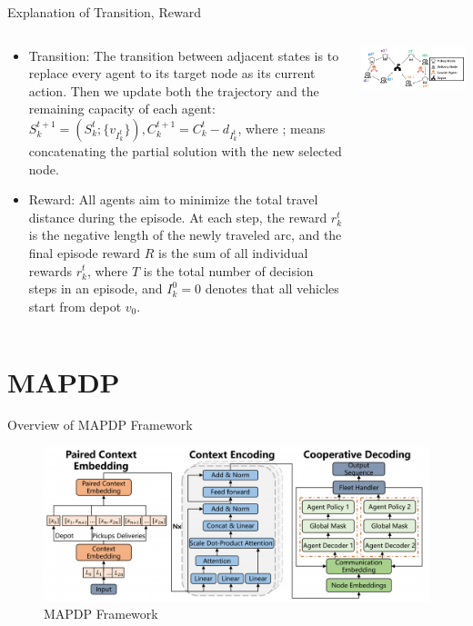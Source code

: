 \documentclass{beamer}
\begin{document}
\begin{frame}{Explanation of Transition, Reward}
	\begin{columns}
		\begin{column}{0.4\textwidth}
			\tiny
			\begin{itemize}
				\item Transition: The transition between adjacent states is to replace every agent to its target node as its current action. Then we update both the trajectory and the remaining capacity of each agent: $S_k^{t+1}=(S_k^t;\{v_{I_k^t}\}), C_k^{t+1}=C_k^t-d_{I_k^t}$, where ; means concatenating the partial solution with the new selected node.
				\item Reward: All agents aim to minimize the total travel distance during the episode. At each step, the reward $r_k^t$ is the negative length of the newly traveled arc, and the final episode reward $R$ is the sum of all individual rewards $r_k^t$, where $T$ is the total number of decision steps in an episode, and $I_k^0=0$ denotes that all vehicles start from depot $v_0$.
			\end{itemize}
		\end{column}
		\begin{column}{0.6\textwidth}
			\centering
			\includegraphics[width=\textwidth]{show.png} %
		\end{column}
	\end{columns}
\end{frame}

\section{MAPDP}

\begin{frame}{Overview of MAPDP Framework}
	\begin{figure}
		\centering
		\hspace{-1.2cm} %
		\includegraphics[scale=0.199]{model_structure.png}
		\caption{MAPDP Framework}
	\end{figure}
\end{frame}
\end{document}
